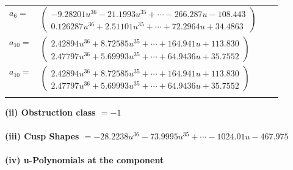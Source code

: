 \documentclass[1p]{elsarticle_modified}
\theoremstyle{definition}
\begin{document}
\begin{tabular}{m{7pt} m{180pt} m{7pt} m{180pt} }
\flushright $a_{6}=$&$\begin{pmatrix}-9.28201 u^{36}-21.1993 u^{35}+\cdots-266.287 u-108.443\\0.126287 u^{36}+2.51101 u^{35}+\cdots+72.2964 u+34.4863\end{pmatrix}$ \\
\flushright $a_{10}=$&$\begin{pmatrix}2.42894 u^{36}+8.72585 u^{35}+\cdots+164.941 u+113.830\\2.47797 u^{36}+5.69993 u^{35}+\cdots+64.9436 u+35.7552\end{pmatrix}$\\ \flushright $a_{10}=$&$\begin{pmatrix}2.42894 u^{36}+8.72585 u^{35}+\cdots+164.941 u+113.830\\2.47797 u^{36}+5.69993 u^{35}+\cdots+64.9436 u+35.7552\end{pmatrix}$\\&\end{tabular}
\flushleft \textbf{(ii) Obstruction class $= -1$}\\~\\
\flushleft \textbf{(iii) Cusp Shapes $= -28.2238 u^{36}-73.9995 u^{35}+\cdots-1024.01 u-467.975$}\\~\\
\newpage\renewcommand{\arraystretch}{1}
\flushleft \textbf{(iv) u-Polynomials at the component}\newline \\
\end{document}
